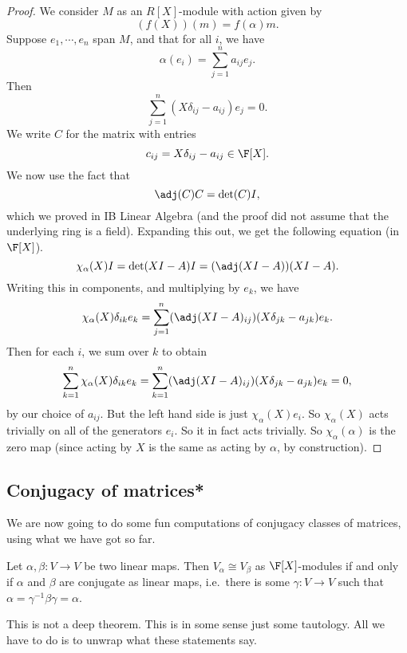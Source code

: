 \documentclass[a4paper]{article}
\begin{document}
\begin{proof}
  We consider $M$ as an $R[X]$-module with action given by
  \[
    (f(X))(m) = f(\alpha) m.
  \]
  Suppose $e_1, \cdots, e_n$ span $M$, and that for all $i$, we have
  \[
    \alpha(e_i) = \sum_{j = 1}^n a_{ij} e_j.
  \]
  Then
  \[
    \sum_{j = 1}^n (X \delta_{ij} - a_{ij}) e_j = 0.
  \]
  We write $C$ for the matrix with entries
  \[
    c_{ij} = X \delta_{ij} - a_{ij} \in \F[X].
  \]
  We now use the fact that
  \[
    \adj(C) C = \det(C) I,
  \]
  which we proved in IB Linear Algebra (and the proof did not assume that the underlying ring is a field). Expanding this out, we get the following equation (in $\F[X]$).
  \[
    \chi_\alpha (X) I = \det(XI - A) I = (\adj(XI - A)) (XI - A).
  \]
  Writing this in components, and multiplying by $e_k$, we have
  \[
    \chi_\alpha(X) \delta_{ik}e_k = \sum_{j = 1}^n (\adj(XI - A)_{ij}) (X \delta_{jk} - a_{jk}) e_k.
  \]
  Then for each $i$, we sum over $k$ to obtain
  \[
    \sum_{k = 1}^n \chi_\alpha(X) \delta_{ik} e_k = \sum_{k = 1}^n (\adj(XI - A)_{ij}) (X \delta_{jk} - a_{jk}) e_k = 0,
  \]
  by our choice of $a_{ij}$. But the left hand side is just $\chi_{\alpha}(X) e_i$. So $\chi_\alpha(X)$ acts trivially on all of the generators $e_i$. So it in fact acts trivially. So $\chi_\alpha(\alpha)$ is the zero map (since acting by $X$ is the same as acting by $\alpha$, by construction).
\end{proof}

\subsection{Conjugacy of matrices*}
We are now going to do some fun computations of conjugacy classes of matrices, using what we have got so far.
\begin{lemma}
  Let $\alpha, \beta: V \to V$ be two linear maps. Then $V_\alpha\cong V_\beta$ as $\F[X]$-modules if and only if $\alpha$ and $\beta$ are conjugate as linear maps, i.e.\ there is some $\gamma: V \to V$ such that $\alpha = \gamma^{-1}\beta\gamma = \alpha$.
\end{lemma}
This is not a deep theorem. This is in some sense just some tautology. All we have to do is to unwrap what these statements say.
\end{document}
